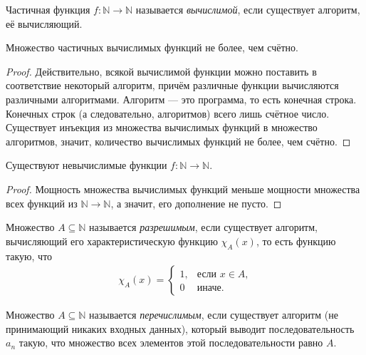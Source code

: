 \documentclass{article}
\begin{document}
    \begin{definition}
        Частичная функция $f: \mathbb{N} \to \mathbb{N}$ называется \textit{вычислимой}, если существует
        алгоритм, её вычисляющий.
    \end{definition}

    \begin{statement}
        Множество частичных вычислимых функций не более, чем счётно.
    \end{statement}
    \begin{proof}
        Действительно, всякой вычислимой функции можно поставить в соответствие некоторый алгоритм,
        причём различные функции вычисляются различными алгоритмами. Алгоритм --- это программа,
        то есть конечная строка. Конечных строк (а следовательно, алгоритмов) всего лишь счётное число.
        Существует инъекция из множества вычислимых функций в множество алгоритмов, значит, количество
        вычислимых функций не более, чем счётно.
    \end{proof}

    \begin{theorem}
        Существуют невычислимые функции $f: \mathbb{N} \to \mathbb{N}$.
    \end{theorem}
    \begin{proof}
        Мощность множества вычислимых функций меньше мощности множества всех функций из $\mathbb{N}
        \to \mathbb{N}$, а значит, его дополнение не пусто.
    \end{proof}

    \begin{definition}
        Множество $A \subseteq \mathbb{N}$ называется \textit{разрешимым}, если существует алгоритм, вычисляющий
        его характеристическую функцию $\chi_A(x)$, то есть функцию такую, что
        \begin{gather*}
            \chi_A(x) =
            \begin{cases}
                1, & \text{если $x \in A$,}\\
                0 & \text{иначе.}
            \end{cases}
        \end{gather*}
    \end{definition}

    \begin{definition}
        Множество $A \subseteq \mathbb{N}$ называется \textit{перечислимым}, если существует
        алгоритм (не принимающий никаких входных данных), который выводит последовательность $a_n$
        такую, что множество всех элементов этой последовательности равно $A$.
    \end{definition}
\end{document}
